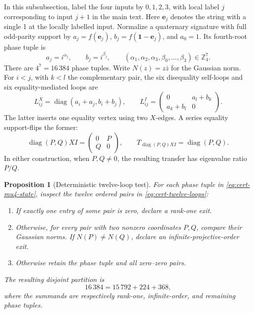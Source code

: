 \documentclass[11pt,letterpaper,onecolumn]{article}
\theoremstyle{plain}
\newtheorem{proposition}[proposition]{Proposition}
\theoremstyle{definition}
\theoremstyle{remark}
\newcommand{\diag}{\operatorname{diag}}
\newcommand{\one}{\mathbf 1}
\begin{document}
In this subsubsection, label the four inputs by \(0,1,2,3\),
with local label \(j\) corresponding to input \(j+1\) in the main text.
Here \({\mathbf{e}}_j\) denotes the string with a single 1 at the locally labelled input.
Normalize a quaternary signature with full odd-parity support by
\(a_j=f({\mathbf{e}}_j)\), \(b_j=f(\one-{\mathbf{e}}_j)\), and \(a_0=1\).  Its fourth-root
phase tuple is
\begin{equation}
  a_j=i^{\alpha_j},\qquad b_j=i^{\beta_j},
  \qquad
  (\alpha_1,\alpha_2,\alpha_3,\beta_0,\ldots,\beta_3)
  \in\mathbb Z_4^7.
  \label{eq:cert-mu4-state}
\end{equation}
There are \(4^7=16\,384\) phase tuples. Write \(N(z)=z\bar z\) for the Gaussian
norm.  For \(i<j\), with \(k<l\) the complementary pair, the six disequality self-loops and six equality-mediated loops are
\begin{equation}
 L^X_{ij}=\diag(a_i+a_j,b_i+b_j),
 \qquad
 L^I_{ij}=
 \begin{pmatrix}0&a_l+b_k\\a_k+b_l&0\end{pmatrix}.
  \label{eq:cert-twelve-loops}
\end{equation}
The latter inserts one equality vertex using two \(X\)-edges.  A
series equality support-flips the former:
\begin{equation}
 \diag(P,Q)XI=\begin{pmatrix}0&P\\Q&0\end{pmatrix},
 \qquad
 T_{\diag(P,Q)XI}=\diag(P,Q).
  \label{eq:cert-diagonal-loop-support-flip}
\end{equation}
In either construction, when \(P,Q\ne0\), the resulting transfer has
eigenvalue ratio \(P/Q\).

\begin{proposition}[Deterministic twelve-loop test]
\label{prop:cert-twelve-loop}
For each phase tuple in \cref{eq:cert-mu4-state}, inspect the twelve ordered pairs
in \cref{eq:cert-twelve-loops}:
\begin{enumerate}[label=\textnormal{(\roman*)}]
  \item If exactly one entry of some pair is zero, declare a rank-one
  exit.
  \item Otherwise, for every pair with two nonzero coordinates \(P,Q\),
  compare their Gaussian norms.  If \(N(P)\neq N(Q)\), declare an
  infinite-projective-order exit.
  \item Otherwise retain the phase tuple and all zero--zero pairs.
\end{enumerate}
The resulting disjoint partition is
\begin{equation}
 16\,384=15\,792+224+368,
 \label{eq:cert-mu4-histogram}
\end{equation}
where the summands are respectively rank-one, infinite-order, and remaining
phase tuples.
\end{proposition}
\end{document}
